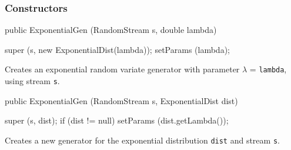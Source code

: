 \subsubsection* {Constructors}
\begin{code}

   public ExponentialGen (RandomStream s, double lambda) \begin{hide} {
      super (s, new ExponentialDist(lambda));
      setParams (lambda);
   }\end{hide}
\end{code} 
\begin{tabb} Creates an exponential random variate generator with
 parameter $\lambda $ = \texttt{lambda}, using stream \texttt{s}. 
\end{tabb}
\begin{code}

   public ExponentialGen (RandomStream s, ExponentialDist dist) \begin{hide} {
      super (s, dist);
      if (dist != null)
         setParams (dist.getLambda());
   } \end{hide}
\end{code}
 \begin{tabb}  Creates a new generator for the exponential 
   distribution \texttt{dist} and stream \texttt{s}.   
 \end{tabb}

